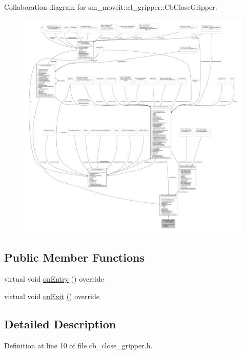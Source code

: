 Collaboration diagram for sm\+\_\+moveit\+:\+:cl\+\_\+gripper\+:\+:Cb\+Close\+Gripper\+:
\nopagebreak
\begin{figure}[H]
\begin{center}
\leavevmode
\includegraphics[width=350pt]{classsm__moveit_1_1cl__gripper_1_1CbCloseGripper__coll__graph}
\end{center}
\end{figure}
\subsection*{Public Member Functions}
\begin{DoxyCompactItemize}
\item 
virtual void \hyperlink{classsm__moveit_1_1cl__gripper_1_1CbCloseGripper_adc772dda477c6370dc41117613e35699}{on\+Entry} () override
\item 
virtual void \hyperlink{classsm__moveit_1_1cl__gripper_1_1CbCloseGripper_a643cca41b7a62a3c2b26e07ab7edb05a}{on\+Exit} () override
\end{DoxyCompactItemize}


\subsection{Detailed Description}


Definition at line 10 of file cb\+\_\+close\+\_\+gripper.\+h.



